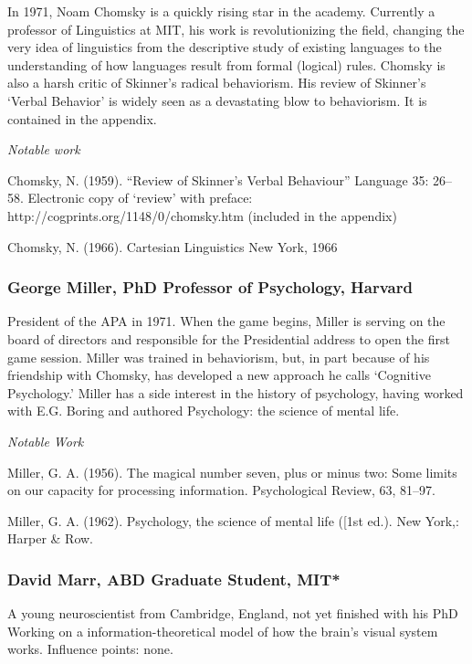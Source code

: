\begin{refsection}
In 1971, Noam Chomsky is a quickly rising star in the academy. Currently a professor of Linguistics at MIT, his work is revolutionizing the field, changing the very idea of linguistics from the descriptive study of existing languages to the understanding of how languages result from formal (logical) rules. Chomsky is also a harsh critic of Skinner's radical behaviorism. His review of Skinner's `Verbal Behavior' is widely seen as a devastating blow to behaviorism. It is contained in the appendix.

\emph{Notable work}

Chomsky, N. (1959). ``Review of Skinner's Verbal Behaviour'' Language 35: 26--58. Electronic copy of ‘review’ with preface: http:\slash \slash cogprints.org\slash 1148\slash 0\slash chomsky.htm (included in the appendix)

Chomsky, N. (1966). Cartesian Linguistics New York, 1966

\subsubsection{George Miller, PhD Professor of Psychology, Harvard}
\label{georgemillerphdprofessorofpsychologyharvard}

President of the APA in 1971. When the game begins, Miller is serving on the board of directors and responsible for the Presidential address to open the first game session. Miller was trained in behaviorism, but, in part because of his friendship with Chomsky, has developed a new approach he calls `Cognitive Psychology.' Miller has a side interest in the history of psychology, having worked with E.G. Boring and authored Psychology: the science of mental life.

\emph{Notable Work}

Miller, G. A. (1956). The magical number seven, plus or minus two: Some limits on our capacity for processing information. Psychological Review, 63, 81--97.

Miller, G. A. (1962). Psychology, the science of mental life ([1st ed.). New York,: Harper \& Row.

\subsubsection{David Marr, ABD Graduate Student, MIT*}
\label{davidmarrabdgraduatestudentmit}

A young neuroscientist from Cambridge, England, not yet finished with his PhD Working on a information-theoretical model of how the brain's visual system works.
Influence points: none.


\end{refsection}
